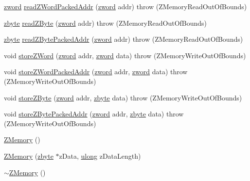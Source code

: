 \begin{DoxyCompactItemize}
\hyperlink{zglobal_8h_a6507dc55d18847442d5fb20b6c73fe73}{zword} \hyperlink{class_z_memory_ad74221329cb16f4b08cb9b6abc2e1c10}{read\-Z\-Word\-Packed\-Addr} (\hyperlink{zglobal_8h_a6507dc55d18847442d5fb20b6c73fe73}{zword} addr)  throw (\-Z\-Memory\-Read\-Out\-Of\-Bounds)
\item 
\hyperlink{zglobal_8h_aab4ef09707609e67bcc5a552cde255d2}{zbyte} \hyperlink{class_z_memory_a6ca3e706d4fef287677eb1171e9d88d7}{read\-Z\-Byte} (\hyperlink{zglobal_8h_a6507dc55d18847442d5fb20b6c73fe73}{zword} addr)  throw (\-Z\-Memory\-Read\-Out\-Of\-Bounds)
\item 
\hyperlink{zglobal_8h_aab4ef09707609e67bcc5a552cde255d2}{zbyte} \hyperlink{class_z_memory_aff0202af0bac630b9119196bc70fd087}{read\-Z\-Byte\-Packed\-Addr} (\hyperlink{zglobal_8h_a6507dc55d18847442d5fb20b6c73fe73}{zword} addr)  throw (\-Z\-Memory\-Read\-Out\-Of\-Bounds)
\item 
void \hyperlink{class_z_memory_a2e261ca55a5ca5f047a345f9478579fd}{store\-Z\-Word} (\hyperlink{zglobal_8h_a6507dc55d18847442d5fb20b6c73fe73}{zword} addr, \hyperlink{zglobal_8h_a6507dc55d18847442d5fb20b6c73fe73}{zword} data)  throw (\-Z\-Memory\-Write\-Out\-Of\-Bounds)
\item 
void \hyperlink{class_z_memory_abf715d1780c0ec3f8e399d4c4d24b083}{store\-Z\-Word\-Packed\-Addr} (\hyperlink{zglobal_8h_a6507dc55d18847442d5fb20b6c73fe73}{zword} addr, \hyperlink{zglobal_8h_a6507dc55d18847442d5fb20b6c73fe73}{zword} data)  throw (\-Z\-Memory\-Write\-Out\-Of\-Bounds)
\item 
void \hyperlink{class_z_memory_a8ee9c13cf3c1be05093e4725e3f54822}{store\-Z\-Byte} (\hyperlink{zglobal_8h_a6507dc55d18847442d5fb20b6c73fe73}{zword} addr, \hyperlink{zglobal_8h_aab4ef09707609e67bcc5a552cde255d2}{zbyte} data)  throw (\-Z\-Memory\-Write\-Out\-Of\-Bounds)
\item 
void \hyperlink{class_z_memory_a1620640052e61e1118305329f49eea2f}{store\-Z\-Byte\-Packed\-Addr} (\hyperlink{zglobal_8h_a6507dc55d18847442d5fb20b6c73fe73}{zword} addr, \hyperlink{zglobal_8h_aab4ef09707609e67bcc5a552cde255d2}{zbyte} data)  throw (\-Z\-Memory\-Write\-Out\-Of\-Bounds)
\item 
\hyperlink{class_z_memory_a83f209a355f1d154be6037b7e6cc4f21}{Z\-Memory} ()
\item 
\hyperlink{class_z_memory_a5c7d09e5e24dbe1fb9b013bba0320b62}{Z\-Memory} (\hyperlink{zglobal_8h_aab4ef09707609e67bcc5a552cde255d2}{zbyte} $\ast$z\-Data, \hyperlink{zglobal_8h_a718b4eb2652c286f4d42dc18a8e71a1a}{ulong} z\-Data\-Length)
\item 
\hyperlink{class_z_memory_aa98d6ee3984021ff330fdeb1158a23f1}{$\sim$\-Z\-Memory} ()
\end{DoxyCompactItemize}


